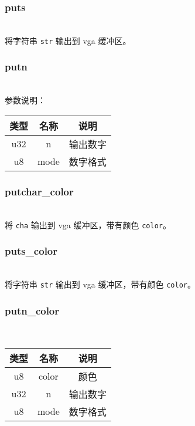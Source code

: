\subsubsection{puts}
 \\
将字符串 \texttt{str} 输出到 vga 缓冲区。

\subsubsection{putn}
 \\

参数说明：

\begin{tabular}{|c|c|c|}
    \hline
    类型 & 名称 & 说明\\\hline
    u32 & n & 输出数字\\\hline
    u8 & mode & 数字格式\\\hline
\end{tabular}

\subsubsection{putchar\_color}
\\
将 \texttt{cha} 输出到 vga 缓冲区，带有颜色 \texttt{color}。

\subsubsection{puts\_color}
 \\
将字符串 \texttt{str} 输出到 vga 缓冲区，带有颜色 \texttt{color}。


\subsubsection{putn\_color}
\\
\begin{tabular}{|c|c|c|}
    \hline
    类型 & 名称 & 说明\\\hline
    u8 & color & 颜色\\\hline
    u32 & n & 输出数字\\\hline
    u8 & mode & 数字格式\\\hline
\end{tabular}\\